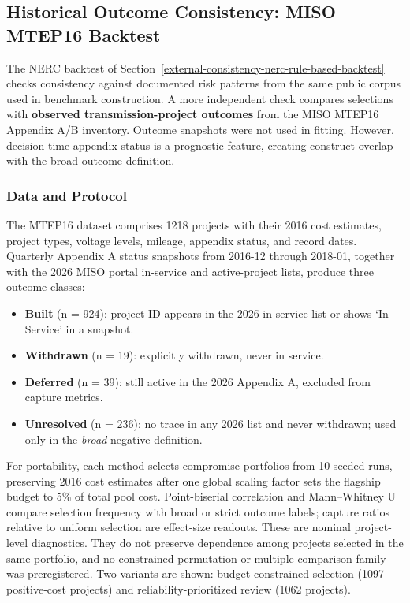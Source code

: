 \documentclass[applsci,article,submit,moreauthors]{Definitions/mdpi}
\providecommand{\tightlist}{\setlength{\itemsep}{0pt}\setlength{\parskip}{0pt}}
\begin{document}
\subsection{Historical Outcome Consistency: MISO MTEP16 Backtest}\label{historical-outcome-consistency-miso-mtep16-backtest}

The NERC backtest of Section~\ref{external-consistency-nerc-rule-based-backtest} checks consistency against documented risk patterns from the same public corpus used in benchmark construction. A more independent check compares selections with \textbf{observed transmission-project outcomes} from the MISO MTEP16 Appendix A/B inventory. Outcome snapshots were not used in fitting. However, decision-time appendix status is a prognostic feature, creating construct overlap with the broad outcome definition.

\subsubsection{Data and Protocol}\label{data-and-protocol}

The MTEP16 dataset comprises 1218 projects with their 2016 cost estimates, project types, voltage levels, mileage, appendix status, and record dates. Quarterly Appendix A status snapshots from 2016-12 through 2018-01, together with the 2026 MISO portal in-service and active-project lists, produce three outcome classes:

\begin{itemize}
\tightlist
\item
  \textbf{Built} (n = 924): project ID appears in the 2026 in-service list or shows `In Service' in a snapshot.
\item
  \textbf{Withdrawn} (n = 19): explicitly withdrawn, never in service.
\item
  \textbf{Deferred} (n = 39): still active in the 2026 Appendix A, excluded from capture metrics.
\item
  \textbf{Unresolved} (n = 236): no trace in any 2026 list and never withdrawn; used only in the \emph{broad} negative definition.
\end{itemize}

For portability, each method selects compromise portfolios from 10 seeded runs, preserving 2016 cost estimates after one global scaling factor sets the flagship budget to 5\% of total pool cost. Point-biserial correlation and Mann--Whitney U compare selection frequency with broad or strict outcome labels; capture ratios relative to uniform selection are effect-size readouts. These are nominal project-level diagnostics. They do not preserve dependence among projects selected in the same portfolio, and no constrained-permutation or multiple-comparison family was preregistered. Two variants are shown: budget-constrained selection (1097 positive-cost projects) and reliability-prioritized review (1062 projects).
\end{document}
